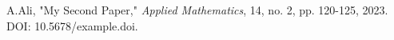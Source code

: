 \documentclass[11pt]{article}
\begin{document}
\noindent
A.Ali, "My Second Paper," \textit{Applied Mathematics}, 14, no. 2, pp. 120-125, 2023. DOI: 10.5678/example.doi.
\end{document}
